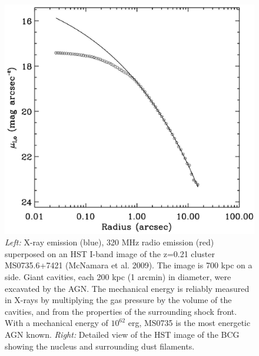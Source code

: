 \documentclass[12pt]{article}
\begin{document}
\begin{figure}[ht]
\begin{center}
\begin{minipage}{0.52\linewidth}
    \end{minipage}
    \caption{{\it{Left:}} X-ray 
emission (blue), 320 MHz radio emission (red) superposed on an HST I-band image of the 
z=0.21 cluster MS0735.6+7421 (McNamara et al. 2009).  The image is 700 kpc on a 
side.  Giant cavities, each 200 kpc (1 arcmin) in diameter, were excavated by the 
AGN.  The mechanical energy is reliably measured in X-rays by multiplying the gas 
pressure by the volume of the cavities, and from the properties of the surrounding 
shock front.  With a mechanical energy of $10^{62}$ erg, MS0735 is the most energetic 
AGN known. {\it{Right:}} Detailed view of the HST image of the BCG showing the nucleus and
surrounding dust filaments.}
    \begin{minipage}{0.52\linewidth}    
      \includegraphics*[width=\textwidth, trim=15mm 5mm 0mm 10mm, clip]{fig9}
    \end{minipage}
    \begin{minipage}{0.47\linewidth}    

\end{minipage}
\end{center}
\end{figure}
\end{document}
